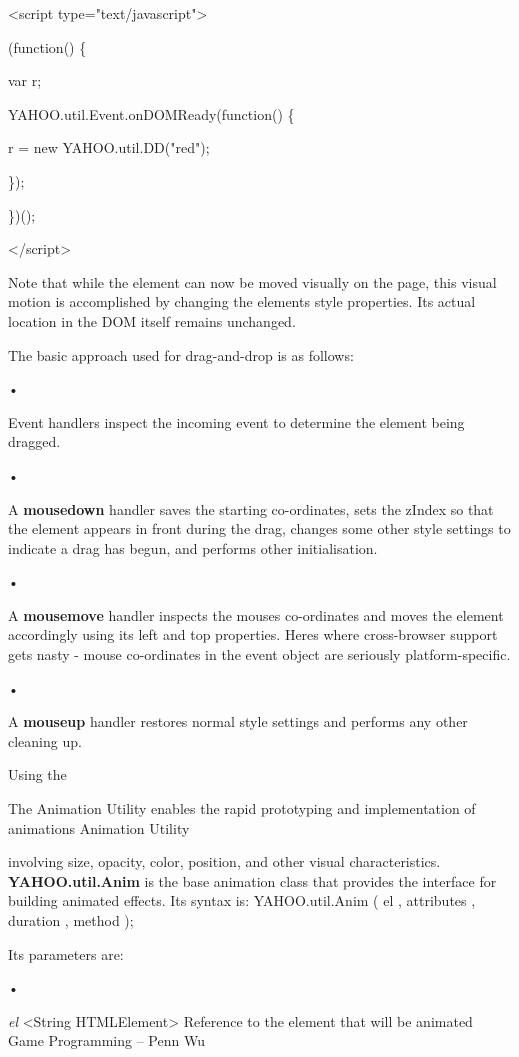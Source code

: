 \documentclass[
]{article}
\begin{document}
\textless script type="text/javascript"\textgreater{}

(function() \{

var r;

YAHOO.util.Event.onDOMReady(function() \{

r = new YAHOO.util.DD("red");

\});

\})();

\textless/script\textgreater{}

Note that while the element can now be moved visually on the page, this
visual motion is accomplished by changing the element\textquotesingle s
style properties. Its actual location in the DOM itself remains
unchanged.

The basic approach used for drag-and-drop is as follows:

•

Event handlers inspect the incoming event to determine the element being
dragged.

•

A \textbf{mousedown} handler saves the starting co-ordinates, sets the
zIndex so that the element appears in front during the drag, changes
some other style settings to indicate a drag has begun, and performs
other initialisation.

•

A \textbf{mousemove} handler inspects the mouse\textquotesingle s
co-ordinates and moves the element accordingly using its left and top
properties. Here\textquotesingle s where cross-browser support gets
nasty - mouse co-ordinates in the event object are seriously
platform-specific.

•

A \textbf{mouseup} handler restores normal style settings and performs
any other cleaning up.

Using the

The Animation Utility enables the rapid prototyping and implementation
of animations Animation Utility

involving size, opacity, color, position, and other visual
characteristics. \textbf{YAHOO.util.Anim} is the base animation class
that provides the interface for building animated effects. Its syntax
is: YAHOO.util.Anim ( el , attributes , duration , method );

Its parameters are:

•

\emph{el} \textless String \textbar{} HTMLElement\textgreater{}
Reference to the element that will be animated Game Programming -- Penn
Wu
\end{document}
